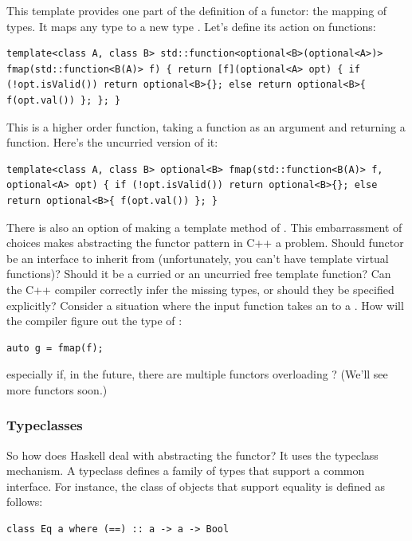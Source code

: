 This template provides one part of the definition of a functor: the
mapping of types. It maps any type  to a new type
. Let's define its action on
functions:

\begin{verbatim}
template<class A, class B> std::function<optional<B>(optional<A>)> fmap(std::function<B(A)> f) { return [f](optional<A> opt) { if (!opt.isValid()) return optional<B>{}; else return optional<B>{ f(opt.val()) }; }; }
\end{verbatim}

This is a higher order function, taking a function as an argument and
returning a function. Here's the uncurried version of it:

\begin{verbatim}
template<class A, class B> optional<B> fmap(std::function<B(A)> f, optional<A> opt) { if (!opt.isValid()) return optional<B>{}; else return optional<B>{ f(opt.val()) }; }
\end{verbatim}

There is also an option of making  a template method of
. This embarrassment of choices makes abstracting the
functor pattern in C++ a problem. Should functor be an interface to
inherit from (unfortunately, you can't have template virtual functions)?
Should it be a curried or an uncurried free template function? Can the
C++ compiler correctly infer the missing types, or should they be
specified explicitly? Consider a situation where the input function
 takes an  to a . How will the
compiler figure out the type of :

\begin{verbatim}
auto g = fmap(f);
\end{verbatim}

especially if, in the future, there are multiple functors overloading
? (We'll see more functors soon.)

\subsubsection{Typeclasses}\label{typeclasses}

So how does Haskell deal with abstracting the functor? It uses the
typeclass mechanism. A typeclass defines a family of types that support
a common interface. For instance, the class of objects that support
equality is defined as follows:

\begin{verbatim}
class Eq a where (==) :: a -> a -> Bool
\end{verbatim}

